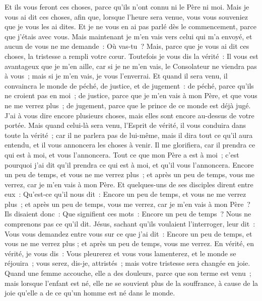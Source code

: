 \begin{multicols}{2}
Et ils vous feront ces choses, parce qu'ils n'ont connu ni le Père ni moi.
Mais je vous ai dit ces choses, afin que, lorsque l'heure sera venue, vous vous souveniez que je vous les ai dites. Et je ne vous en ai pas parlé dès le commencement, parce que j'étais avec vous.
Mais maintenant je m'en vais vers celui qui m'a envoyé, et aucun de vous ne me demande~: Où vas-tu~?
Mais, parce que je vous ai dit ces choses, la tristesse a rempli votre cœur.
Toutefois je vous dis la vérité~: Il vous est avantageux que je m'en aille, car si je ne m'en vais, le Consolateur ne viendra pas à vous~; mais si je m'en vais, je vous l'enverrai.
Et quand il sera venu, il convaincra le monde de péché, de justice, et de jugement~:
de péché, parce qu'ils ne croient pas en moi~;
de justice, parce que je m'en vais à mon Père, et que vous ne me verrez plus~;
de jugement, parce que le prince de ce monde est déjà jugé.
 J'ai à vous dire encore plusieurs choses, mais elles sont encore au-dessus de votre portée.
Mais quand celui-là sera venu, l'Esprit de vérité, il vous conduira dans toute la vérité~; car il ne parlera pas de lui-même, mais il dira tout ce qu'il aura entendu, et il vous annoncera les choses à venir.
Il me glorifiera, car il prendra ce qui est à moi, et vous l'annoncera.
Tout ce que mon Père a est à moi~; c'est pourquoi j'ai dit qu'il prendra ce qui est à moi, et qu'il vous l'annoncera.
Encore un peu de temps, et vous ne me verrez plus~; et après un peu de temps, vous me verrez, car je m'en vais à mon Père.
Et quelques-uns de ses disciples dirent entre eux~: Qu'est-ce qu'il nous dit~: Encore un peu de temps, et vous ne me verrez plus~; et après un peu de temps, vous me verrez, car je m'en vais à mon Père~?
Ils disaient donc~: Que signifient ces mots~: Encore un peu de temps~? Nous ne comprenons pas ce qu'il dit.
Jésus, sachant qu'ils voulaient l'interroger, leur dit~: Vous vous demandez entre vous sur ce que j'ai dit~: Encore un peu de temps, et vous ne me verrez plus ; et après un peu de temps, vous me verrez.
En vérité, en vérité, je vous dis~: Vous pleurerez et vous vous lamenterez, et le monde se réjouira~; vous serez, dis-je, attristés~; mais votre tristesse sera changée en joie.
Quand une femme accouche, elle a des douleurs, parce que son terme est venu~; mais lorsque l'enfant est né, elle ne se souvient plus de la souffrance, à cause de la joie qu'elle a de ce qu'un homme est né dans le monde.

\end{multicols}
